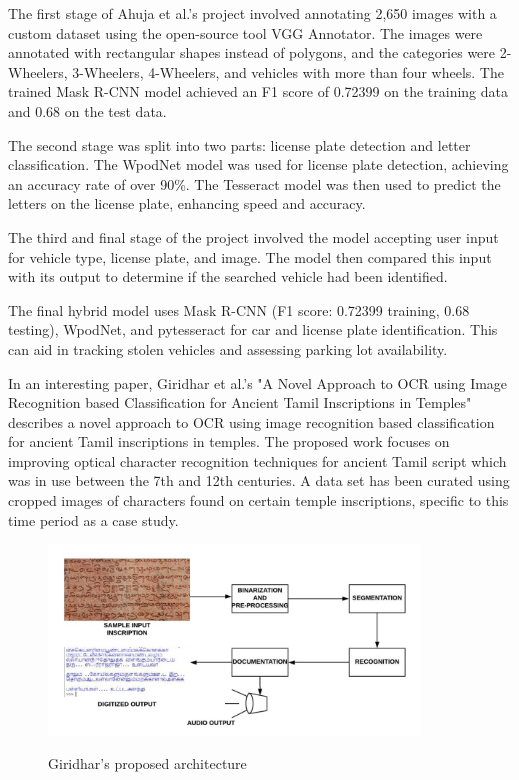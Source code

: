 The first stage of Ahuja et al.'s project involved annotating 2,650 images with a custom dataset using the open-source tool VGG Annotator. The images were annotated with rectangular shapes instead of polygons, and the categories were 2-Wheelers, 3-Wheelers, 4-Wheelers, and vehicles with more than four wheels. The trained Mask R-CNN model achieved an F1 score of 0.72399 on the training data and 0.68 on the test data.

The second stage was split into two parts: license plate detection and letter classification. The WpodNet model was used for license plate detection, achieving an accuracy rate of over 90\%. The Tesseract model was then used to predict the letters on the license plate, enhancing speed and accuracy.

The third and final stage of the project involved the model accepting user input for vehicle type, license plate, and image. The model then compared this input with its output to determine if the searched vehicle had been identified.

The final hybrid model uses Mask R-CNN (F1 score: 0.72399 training, 0.68 testing), WpodNet, and pytesseract for car and license plate identification. This can aid in tracking stolen vehicles and assessing parking lot availability.


In an interesting paper, Giridhar et al.'s "A Novel Approach to OCR using Image Recognition based Classification for Ancient Tamil Inscriptions in Temples" describes a novel approach to OCR using image recognition based classification for ancient Tamil inscriptions in temples. The proposed work focuses on improving optical character recognition techniques for ancient Tamil script which was in use between the 7th and 12th centuries. A data set has been curated using cropped images of characters found on certain temple inscriptions, specific to this time period as a case study.

\begin{figure}[ht]
    \centering
    \includegraphics[width=0.88\textwidth]{Figures/tesseract_papers/Giridhar_2019.jpg}
    \caption[Giridhar's proposed architecture]{Giridhar's proposed architecture}\cite{giridharNovelApproachOCR2019}
    \label{fig:Giridhar's proposed architecture}
\end{figure}


